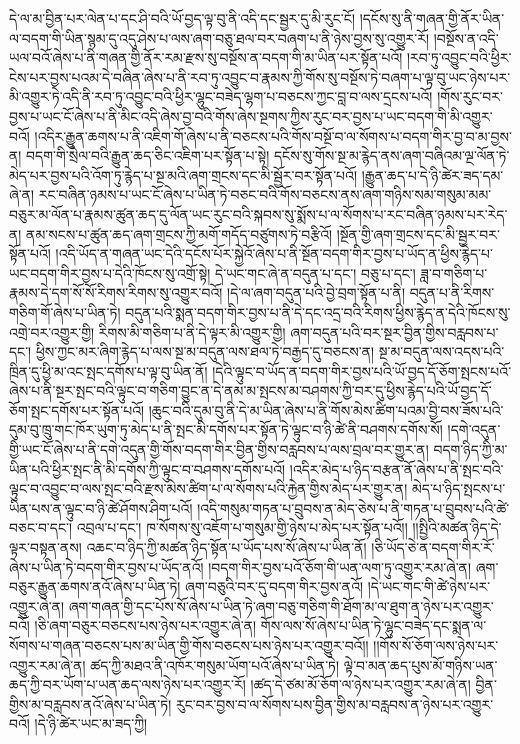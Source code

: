 དེ་ལ་མ་བྱིན་པར་ལེན་པ་དང་ཤི་བའི་ཡོ་བྱད་ལྟ་བུ་ནི་འདི་དང་སྦྱར་དུ་མི་རུང་ངོ། །དངོས་སུ་ནི་གཞན་གྱི་ནོར་ཡིན་ལ་བདག་གི་ཡིན་སྙམ་དུ་འདུ་ཤེས་པ་ལས་ཞག་བཅུ་ཐལ་བར་བཞག་པ་ནི་ཉེས་བྱས་སུ་འགྱུར་རོ། །བསྔོས་ན་འདི་ཡལ་བའོ་ཞེས་པ་ནི་གཞན་གྱི་ནོར་རམ་རྫས་སུ་བསྔོས་ན་བདག་གི་མ་ཡིན་པར་སྟོན་པའོ། །རབ་ཏུ་འབྱུང་བའི་ཕྱིར་ངེས་པར་བྱས་པའམ་དེ་བཞིན་ཞེས་པ་ནི་རབ་ཏུ་འབྱུང་བ་རྣམས་ཀྱི་གོས་སུ་བསྔོས་ཏེ་བཞག་པ་ལྟ་བུ་ཡང་ཉེས་པར་མི་འགྱུར་ཏེ་འདི་ནི་རབ་ཏུ་འབྱུང་བའི་ཕྱིར་ལྷུང་བཟེད་ལྷག་པ་བཅངས་ཀྱང་བླ་བ་ལས་དྲངས་པའོ། །གོས་རུང་བར་བྱས་པ་ཡང་ངོ་ཞེས་པ་ནི་མིང་འདི་ཞེས་བྱ་བའི་གོས་ཞེས་སྔགས་ཀྱིས་རུང་བར་བྱས་པ་ཡང་བདག་གི་མི་འགྱུར་བའོ། །འདིར་རྒྱུན་ཆགས་པ་ནི་འཇིག་གོ་ཞེས་པ་ནི་བཅངས་པའི་གོས་བསྔོ་བ་ལ་སོགས་པ་བདག་གིར་བྱ་བ་མ་བྱས་ན། བདག་གི་སྲེལ་བའི་རྒྱུན་ཆད་ཅིང་འཇིག་པར་སྟོན་པ་སྟེ། དངོས་སུ་གོས་སྔ་མ་རྙེད་ནས་ཞག་བཞིའམ་ལྔ་ལོན་ཏེ་མེད་པར་བྱས་པའི་འོག་ཏུ་རྙེད་པ་སྔ་མའི་ཞག་གྲངས་དང་མི་སྦྱོར་བར་སྟོན་པའོ། །རྒྱུན་ཆད་པ་དེ་ཉི་ཚེར་ཟད་དམ་ཞེ་ན། རང་བཞིན་ཉམས་པ་ཡང་ངོ་ཞེས་པ་ཡིན་ཏེ་བཅང་བའི་གོས་བཅངས་ནས་ཞག་གཉིས་སམ་གསུམ་མམ་བཅུར་མ་ལོན་པ་རྣམས་ཚུན་ཆད་དུ་ལོན་ཡང་རུང་བའི་སྐབས་སུ་སྨོས་པ་ལ་སོགས་པ་རང་བཞིན་ཉམས་པར་རེད་ན། ནམ་སངས་པ་ཚུན་ཆད་ཞག་གྲངས་ཀྱི་མགོ་གདོད་བཙུགས་ཏེ་བརྩིའོ། །སྔོན་གྱི་ཞག་གྲངས་དང་མི་སྦྱར་བར་སྟོན་པའོ། །འདི་ཡོད་ན་གཞན་ཡང་དེའི་དངོས་པོར་སྐྱེའོ་ཞེས་པ་ནི་སྔོན་བདག་གིར་བྱས་པ་ཡོད་ན་ཕྱིས་རྙེད་པ་ཡང་བདག་གིར་བྱས་པ་དེའི་ཁོངས་སུ་འགྲོ་སྟེ། དེ་ཡང་གང་ཞེ་ན་བདུན་པ་དང་། བཅུ་པ་དང་། ཟླ་བ་གཅིག་པ་རྣམས་དེ་དག་སོ་སོ་རིགས་རིགས་སུ་འགྱུར་བའོ། །དེ་ལ་ཞག་བདུན་པའི་བྱེ་བྲག་སྟོན་པ་ནི། བདུན་པ་ནི་རིགས་གཅིག་གོ་ཞེས་པ་ཡིན་ཏེ། བདུན་པའི་སྨན་བདག་གིར་བྱས་པ་ནི་དེ་དང་འདྲ་བའི་རིགས་ཕྱིས་རྙེད་ན་དེའི་ཁོངས་སུ་འགྲེ་བར་འགྱུར་གྱི། རིགས་མི་གཅིག་པ་ནི་དེ་ལྟར་མི་འགྱུར་གྱི། ཞག་བདུན་པའི་བར་སྔར་བྱིན་གྱིས་བརླབས་པ་དང་། ཕྱིས་ཀྱང་མར་ཞིག་རྙེད་པ་ལས་སྔ་མ་བདུན་ལས་ཐལ་ཏེ་བརྒྱད་དུ་བཅངས་ན། སྔ་མ་བདུན་ལས་འདས་པའི་ཁྲིན་དུ་ཕྱི་མ་འང་སྤང་དགོས་པ་ལྟ་བུ་ཡིན་ནོ། །དེའི་ལྟུང་བ་ཡོད་ན་བདག་གིར་བྱས་པའི་ཡོ་བྱད་དོ་ཅོག་སྤངས་པའོ་ཞེས་པ་ནི་སྔར་སྤང་བའི་ལྟུང་བ་གཅིག་བྱུང་ན་དེ་ནམ་མ་སྤངས་མ་བཤགས་ཀྱི་བར་དུ་ཕྱིས་རྙེད་པའི་ཡོ་བྱད་དོ་ཅོག་སྤང་དགོས་པར་སྟོན་པའོ། །ཆུང་བའི་དུམ་བུ་ནི་དེ་མ་ཡིན་ཞེས་པ་ནི་གོས་མེས་ཚིག་པའམ་བྱི་བས་ཟོས་པའི་དུམ་བུ་ཁྲུ་གང་ཁོར་ཡུག་ཏུ་མེད་པ་ནི་སྤང་མི་དགོས་པར་སྟོན་ཏེ་ལྟུང་བ་ཉི་ཚེ་ནི་བཤགས་དགོས་སོ། །དགེ་འདུན་གྱི་ཡང་ངོ་ཞེས་པ་ནི་དགེ་འདུན་གྱི་གོས་བདག་གིར་བྱིན་གྱིས་བརླབས་པ་ལས་བྲལ་བར་གྱུར་ན། བདག་ཉིད་ཀྱི་མ་ཡིན་པའི་ཕྱིར་སྤང་ནི་མི་དགོས་ཀྱི་ལྟུང་བ་བཤགས་དགོས་པའོ། །འདིར་མེད་པ་ཉིད་བརྩན་ནོ་ཞེས་པ་ནི་སྤང་བའི་ལྟུང་བ་འབྱུང་བ་ལས་སྤང་བའི་རྫས་མེས་ཚིག་པ་ལ་སོགས་པའི་རྐྱེན་གྱིས་མེད་པར་གྱུར་ན། མེད་པ་ཉིད་སྤངས་པ་ཡིན་པས་ན་ལྟུང་བ་ཉི་ཚེ་ཤོགས་ཤིག་པའོ། །འདི་གསུམ་གཏན་པ་བྲུབས་ན་མེད་ཅེས་པ་ནི་གཏན་པ་བྲུབས་པའི་ཚེ་བཅང་བ་དང་། འབྲལ་པ་དང་། ཁ་སོགས་སུ་འཇོག་པ་གསུམ་གྱི་ཉེས་པ་མེད་པར་སྟོན་པའོ།། །།སྤྱིའི་མཚན་ཉིད་དེ་ལྟར་བསྟན་ནས། འཆང་བ་ཉིད་ཀྱི་མཚན་ཉིད་སྟོན་པ་ཡོད་པས་སོ་ཞེས་པ་ཡིན་ནོ། །ཅི་ཡོད་ཅེ་ན་བདག་གིར་རོ་ཞེས་པ་ཡིན་ཏེ་བདག་གིར་བྱས་པ་ཡོད་ནའོ། །བདག་གིར་བྱས་པའོ་ཅོག་གི་ཡན་ལག་ཏུ་འགྱུར་རམ་ཞེ་ན། ཞག་བཅུར་རྒྱུན་ཆགས་ནའོ་ཞེས་པ་ཡིན་ཏེ། ཞག་བཅུའི་བར་དུ་བདག་གིར་བྱས་ནའོ། །དེ་ཡང་གང་གི་ཚེ་ཉེས་པར་འགྱུར་ཞེ་ན། ཞག་གཞན་གྱི་དང་པོས་སོ་ཞེས་པ་ཡིན་ཏེ་ཞག་བཅུ་གཅིག་གི་ཐོག་མ་ལ་ཐུག་ན་ཉེས་པར་འགྱུར་བའོ། །ཅི་ཞག་བཅུར་བཅངས་པས་ཉེས་པར་འགྱུར་ཞེ་ན། གོས་ལས་སོ་ཞེས་པ་ཡིན་ཏེ་ལྷུང་བཟེད་དང་སྨན་ལ་སོགས་པ་གཞན་བཅངས་པས་མ་ཡིན་གྱི་གོས་བཅངས་པས་ཉེས་པར་འགྱུར་བའོ།། །།གོས་སོ་ཅོག་ལས་ཉེས་པར་འགྱུར་རམ་ཞེ་ན། ཚད་ཀྱི་མཐའ་ནི་འཁོར་གསུམ་ཡོག་པའོ་ཞེས་པ་ཡིན་ཏེ། ལྟེ་བ་མན་ཆད་པུས་མོ་གཉིས་ཡན་ཆད་ཀྱི་བར་ཡོག་པ་ཡན་ཆད་ལས་ཉེས་པར་འགྱུར་རོ། །ཚད་དེ་ཙམ་མོ་ཅོག་ལ་ཉེས་པར་འགྱུར་རམ་ཞེ་ན། བྱིན་གྱིས་མ་བརླབས་ནའོ་ཞེས་པ་ཡིན་ཏེ། རུང་བར་བྱས་བ་ལ་སོགས་པས་བྱིན་གྱིས་མ་བརླབས་ན་ཉེས་པར་འགྱུར་བའོ། །དེ་ཉི་ཚེར་ཡང་མ་ཟད་ཀྱི། 